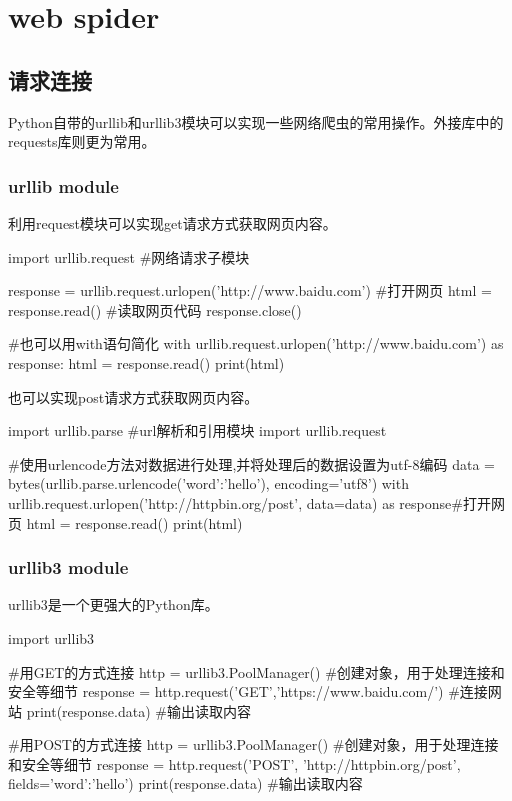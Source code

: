 \documentclass{article}
\begin{document}
  \section{web spider}

    \subsection{请求连接}
      Python自带的urllib和urllib3模块可以实现一些网络爬虫的常用操作。外接库中的requests库则更为常用。
      \subsubsection{urllib module}
        利用request模块可以实现get请求方式获取网页内容。
        \begin{codeblock}[language=python, caption={Fetch web content using GET method}]
          import urllib.request #网络请求子模块

          response = urllib.request.urlopen('http://www.baidu.com') #打开网页
          html = response.read() #读取网页代码
          response.close()

          #也可以用with语句简化
          with urllib.request.urlopen('http://www.baidu.com') as response:
              html = response.read()
          print(html)
        \end{codeblock}

        也可以实现post请求方式获取网页内容。
        \begin{codeblock}[language=python, caption={Fetch web content using POST method}]
          import urllib.parse #url解析和引用模块
          import urllib.request

          #使用urlencode方法对数据进行处理,并将处理后的数据设置为utf-8编码
          data = bytes(urllib.parse.urlencode({'word':'hello'}), encoding='utf8')
          with urllib.request.urlopen('http://httpbin.org/post', data=data) as response#打开网页
              html = response.read()
          print(html)
        \end{codeblock}

      \subsubsection{urllib3 module}
        urllib3是一个更强大的Python库。
        \begin{codeblock}[language=python, caption={urllib3 module}]
          import urllib3

          #用GET的方式连接
          http = urllib3.PoolManager() #创建对象，用于处理连接和安全等细节
          response = http.request('GET','https://www.baidu.com/') #连接网站
          print(response.data) #输出读取内容

          #用POST的方式连接
          http = urllib3.PoolManager() #创建对象，用于处理连接和安全等细节
          response = http.request('POST', 'http://httpbin.org/post', fields={'word':'hello'})
          print(response.data) #输出读取内容
        \end{codeblock}
\end{document}
